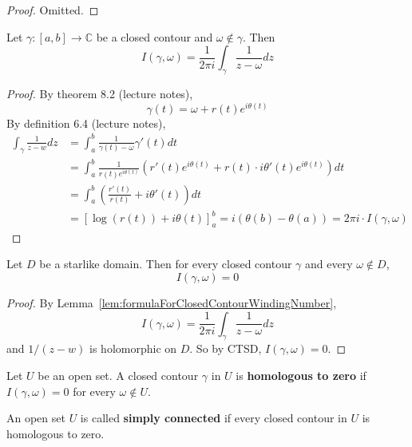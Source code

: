 \begin{proof}
	Omitted.
\end{proof}

\begin{lemma}\label{lem:formulaForClosedContourWindingNumber}
	Let $\gamma: [a, b] \rightarrow \mathbb{C}$ be a closed contour and $\omega \notin \gamma$. Then
	\[
		I(\gamma, \omega) = \frac{1}{2 \pi i} \int_{\gamma} \frac{1}{z - \omega} dz
	\]
\end{lemma}

\begin{proof}
	By theorem 8.2 (lecture notes),
	\[
		\gamma(t) = \omega + r(t) e^{i \theta(t)}
	\]
	By definition 6.4 (lecture notes),
	\[
		\begin{aligned}
			\int_{\gamma} \frac{1}{z - w} dz
				& = \int_{a}^{b} \frac{1}{\gamma(t) - \omega} \gamma'(t) dt \\
				& = \int_{a}^{b} \frac{1}{r(t) e^{i \theta(t)}} \left( r'(t) e^{i \theta(t)} + r(t) \cdot i \theta'(t) e^{i \theta(t)} \right) dt \\
				& = \int_{a}^{b} \left( \frac{r'(t)}{r(t)} + i \theta'(t) \right) dt \\
				& = {[\log(r(t)) + i \theta(t)]}_a^b = i (\theta(b) - \theta(a)) = 2 \pi i \cdot I(\gamma, \omega)
		\end{aligned}
	\]
\end{proof}

\begin{proposition}
	Let $D$ be a starlike domain. Then for every closed contour $\gamma$ and every $\omega \notin D$,
	\[
		I(\gamma, \omega) = 0
	\]
\end{proposition}

\begin{proof}
	By Lemma~\ref{lem:formulaForClosedContourWindingNumber},
	\[
		I(\gamma, \omega) = \frac{1}{2 \pi i} \int_{\gamma} \frac{1}{z - \omega} dz
	\]
	and $1 / (z - w)$ is holomorphic on $D$. So by CTSD, $I(\gamma, \omega) = 0$.
\end{proof}

\begin{definition}
	Let $U$ be an open set. A closed contour $\gamma$ in $U$ is \textbf{homologous to zero} if $I(\gamma, \omega) = 0$ for every $\omega \notin U$.
\end{definition}

\begin{definition}
	An open set $U$ is called \textbf{simply connected} if every closed contour in $U$ is homologous to zero.
\end{definition}

